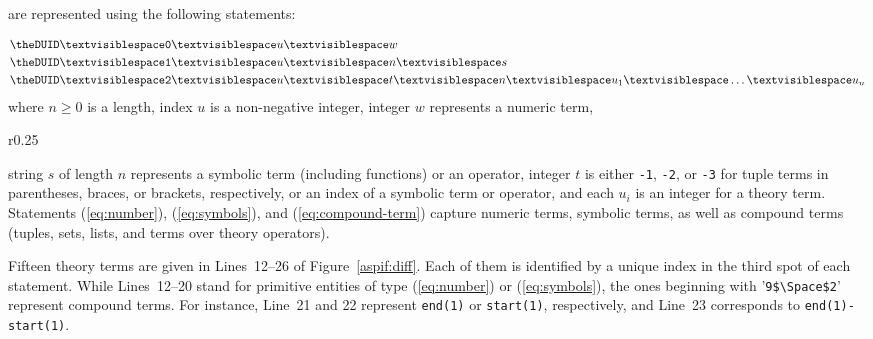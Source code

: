  are represented using the following statements:
\addtocounter{DUID}{1}
\begin{align}
\texttt{\theDUID} \Space \texttt{0} & \Space u \Space w \label{eq:number}\\
\texttt{\theDUID} \Space \texttt{1} & \Space u \Space n \Space s \label{eq:symbols}\\
\texttt{\theDUID} \Space \texttt{2} & \Space u \Space t \Space n \Space u_1 \Space \dots \Space u_n \label{eq:compound-term}
\end{align}
where
$n \geq 0$ is a length,
index $u$ is a non-negative integer,
integer $w$ represents a numeric term,
\begin{wrapfigure}{r}{0.25\textwidth}
\frame%
{\begin{minipage}{0.245\textwidth}
%
\end{minipage}}%
\caption{\label{aspif:diff}\aspif\ format}
\vspace{-42pt}
\end{wrapfigure}
%
string $s$ of length $n$ represents a symbolic term (including functions) or an operator,
integer $t$ is either \texttt{-1}, \texttt{-2}, or \texttt{-3} for tuple terms in parentheses, braces, or brackets, respectively, or an index of a symbolic term or operator, and
each $u_i$ is an integer for a theory term.
%
Statements (\ref{eq:number}), (\ref{eq:symbols}), and (\ref{eq:compound-term})
capture
numeric terms,
symbolic terms, %
as well as
compound terms (tuples, sets, lists, and terms over theory operators).

Fifteen theory terms are given in Lines~12--26 of Figure~\ref{aspif:diff}.
Each of them is identified by a unique index in the third spot of each statement.
While Lines~12--20 stand for primitive entities of type (\ref{eq:number}) or (\ref{eq:symbols}),
the ones beginning with '\lstinline[mathescape=t]{9$\Space$2}' represent compound terms.
For instance, Line~21 and 22 represent \lstinline{end(1)} or  \lstinline{start(1)}, respectively,
and Line~23 corresponds to \lstinline{end(1)-start(1)}.

